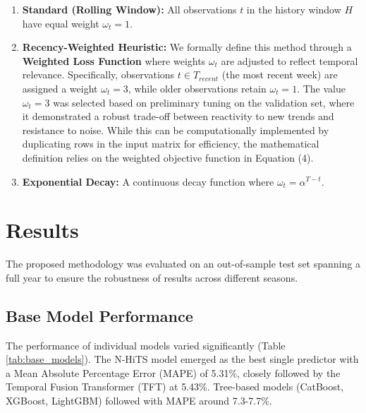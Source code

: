 \documentclass[journal,article,submit,pdftex,moreauthors]{Definitions/mdpi}
\begin{document}
\begin{enumerate}
    \item \textbf{Standard (Rolling Window):} All observations $t$ in the history window $H$ have equal weight $\omega_t = 1$.
    \item \textbf{Recency-Weighted Heuristic:} We formally define this method through a \textbf{Weighted Loss Function} where weights $\omega_t$ are adjusted to reflect temporal relevance. Specifically, observations $t \in T_{recent}$ (the most recent week) are assigned a weight $\omega_t = 3$, while older observations retain $\omega_t = 1$. The value $\omega_t = 3$ was selected based on preliminary tuning on the validation set, where it demonstrated a robust trade-off between reactivity to new trends and resistance to noise. While this can be computationally implemented by duplicating rows in the input matrix for efficiency, the mathematical definition relies on the weighted objective function in Equation (4).
    \item \textbf{Exponential Decay:} A continuous decay function where $\omega_t = \alpha^{T-t}$.
\end{enumerate}

\section{Results}

The proposed methodology was evaluated on an out-of-sample test set spanning a full year to ensure the robustness of results across different seasons.

\subsection{Base Model Performance}
The performance of individual models varied significantly (Table \ref{tab:base_models}). The N-HiTS model emerged as the best single predictor with a Mean Absolute Percentage Error (MAPE) of 5.31\%, closely followed by the Temporal Fusion Transformer (TFT) at 5.43\%. Tree-based models (CatBoost, XGBoost, LightGBM) followed with MAPE around 7.3-7.7\%.
\end{document}
